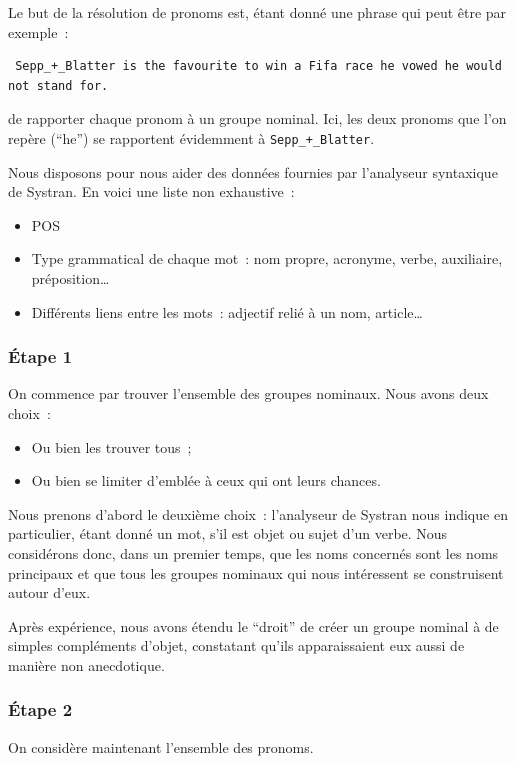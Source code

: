 \documentclass[a4paper, 12pt]{article}
\begin{document}
Le but de la résolution de pronoms est, étant donné une phrase qui peut être par exemple~:

\begin{verbatim}
 Sepp_+_Blatter is the favourite to win a Fifa race he vowed he would not stand for.
\end{verbatim}
de rapporter chaque pronom à un groupe nominal. Ici, les deux pronoms que l'on repère (``he'') se rapportent évidemment à \verb|Sepp_+_Blatter|.

Nous disposons pour nous aider des données fournies par l'analyseur syntaxique de Systran. En voici une liste non exhaustive~:
\begin{itemize}
 \item POS
 \item Type grammatical de chaque mot~: nom propre, acronyme, verbe, auxiliaire, préposition\ldots{}
 \item Différents liens entre les mots~: adjectif relié à un nom, article\ldots{}
\end{itemize}


\subsubsection{Étape 1}
On commence par trouver l'ensemble des groupes nominaux. Nous avons deux choix~:
\begin{itemize}
 \item Ou bien les trouver tous~;
 \item Ou bien se limiter d'emblée à ceux qui ont leurs chances.
\end{itemize}

Nous prenons d'abord le deuxième choix~: l'analyseur de Systran nous indique en particulier, étant donné un mot, s'il est objet ou sujet d'un verbe. Nous considérons donc, dans un premier temps, que les noms concernés sont les noms principaux et que tous les groupes nominaux qui nous intéressent se construisent autour d'eux.

Après expérience, nous avons étendu le ``droit'' de créer un groupe nominal à de simples compléments d'objet, constatant qu'ils apparaissaient eux aussi de manière non anecdotique.


\subsubsection{Étape 2}
On considère maintenant l'ensemble des pronoms.
\end{document}
